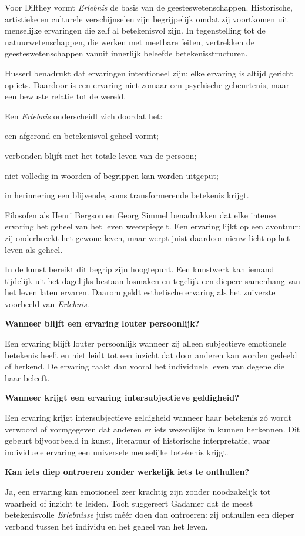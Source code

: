 \documentclass[11pt,twoside,openright]{memoir}
\begin{document}
Voor Dilthey vormt \textit{Erlebnis} de basis van de geesteswetenschappen. Historische, artistieke en culturele verschijnselen zijn begrijpelijk omdat zij voortkomen uit menselijke ervaringen die zelf al betekenisvol zijn. In tegenstelling tot de natuurwetenschappen, die werken met meetbare feiten, vertrekken de geesteswetenschappen vanuit innerlijk beleefde betekenisstructuren.

Husserl benadrukt dat ervaringen intentioneel zijn: elke ervaring is altijd gericht op iets. Daardoor is een ervaring niet zomaar een psychische gebeurtenis, maar een bewuste relatie tot de wereld.

Een \textit{Erlebnis} onderscheidt zich doordat het:

\begin{compactitem}
\item een afgerond en betekenisvol geheel vormt;
\item verbonden blijft met het totale leven van de persoon;
\item niet volledig in woorden of begrippen kan worden uitgeput;
\item in herinnering een blijvende, soms transformerende betekenis krijgt.
\end{compactitem}

Filosofen als Henri Bergson en Georg Simmel benadrukken dat elke intense ervaring het geheel van het leven weerspiegelt. Een ervaring lijkt op een avontuur: zij onderbreekt het gewone leven, maar werpt juist daardoor nieuw licht op het leven als geheel.

In de kunst bereikt dit begrip zijn hoogtepunt. Een kunstwerk kan iemand tijdelijk uit het dagelijks bestaan losmaken en tegelijk een diepere samenhang van het leven laten ervaren. Daarom geldt esthetische ervaring als het zuiverste voorbeeld van \textit{Erlebnis}.

\bigskip
\noindent
\textbf{Wanneer blijft een ervaring louter persoonlijk?}
\medskip

Een ervaring blijft louter persoonlijk wanneer zij alleen subjectieve emotionele betekenis heeft en niet leidt tot een inzicht dat door anderen kan worden gedeeld of herkend. De ervaring raakt dan vooral het individuele leven van degene die haar beleeft.

\bigskip
\noindent
\textbf{Wanneer krijgt een ervaring intersubjectieve geldigheid?}
\medskip

Een ervaring krijgt intersubjectieve geldigheid wanneer haar betekenis zó wordt verwoord of vormgegeven dat anderen er iets wezenlijks in kunnen herkennen. Dit gebeurt bijvoorbeeld in kunst, literatuur of historische interpretatie, waar individuele ervaring een universele menselijke betekenis krijgt.

\bigskip
\noindent
\textbf{Kan iets diep ontroeren zonder werkelijk iets te onthullen?}
\medskip

Ja, een ervaring kan emotioneel zeer krachtig zijn zonder noodzakelijk tot waarheid of inzicht te leiden. Toch suggereert Gadamer dat de meest betekenisvolle \textit{Erlebnisse} juist méér doen dan ontroeren: zij onthullen een dieper verband tussen het individu en het geheel van het leven.
\end{document}
